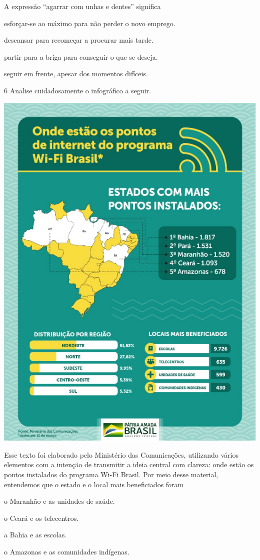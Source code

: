A expressão ``agarrar com unhas e dentes'' significa

\begin{escolha}
\item esforçar-se ao máximo para não perder o novo emprego.

\item descansar para recomeçar a procurar mais tarde.

\item partir para a briga para conseguir o que se deseja.

\item seguir em frente, apesar dos momentos difíceis.
\end{escolha}


\num{6} Analise cuidadosamente o infográfico a seguir.

\begin{center}
\includegraphics[width=.7\textwidth]{./media/simulados/image7.png}
\end{center}

Esse texto foi elaborado pelo Ministério das Comunicações, utilizando
vários elementos com a intenção de transmitir a ideia central com
clareza: onde estão os pontos instalados do programa Wi-Fi Brasil. Por
meio desse material, entendemos que o estado e o local mais beneficiados
foram

\begin{escolha}
\item o Maranhão e as unidades de saúde.

\item o Ceará e os telecentros.

\item a Bahia e as escolas.

\item o Amazonas e as comunidades indígenas.
\end{escolha}

